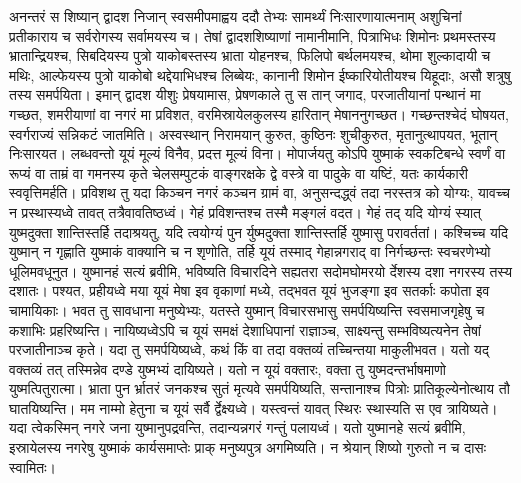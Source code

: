 \adhyAya
{}
\vakya अनन्तरं स शिष्यान् द्वादश निजान् स्वसमीपमाह्वय ददौ तेभ्यः सामर्थ्यं निःसारणायात्मनाम् अशुचिनां प्रतीकाराय च सर्वरोगस्य सर्वामयस्य च।
\vakya तेषां द्वादशशिष्याणां नामानीमानि, पित्राभिधः शिमोनः प्रथमस्तस्य भ्रातान्द्रियश्च, सिबदियस्य पुत्रो याकोबस्तस्य भ्राता योहनश्च,
\vakya फिलिपो बर्थलमयश्च, थोमा शुल्कादायी च मथिः, आल्फेयस्य पुत्रो याकोबो थद्देयाभिधश्च लिब्बेयः,
\vakya कानानी शिमोन ईष्कारियोतीयश्च यिहूदाः, असौ शत्रुषु तस्य समर्पयिता।
\vakya इमान् द्वादश यीशुः प्रेषयामास, प्रेषणकाले तु स तान् जगाद, परजातीयानां पन्थानं मा गच्छत, शमरीयाणां वा नगरं मा प्रविशत, वरमिस्रायेलकुलस्य हारितान् मेषाननुगच्छत।
\vakya गच्छन्तश्चेदं घोषयत, स्वर्गराज्यं सन्निकटं जातमिति।
\vakya अस्वस्थान् निरामयान् कुरुत, कुष्ठिनः शुचीकुरुत, मृतानुत्थापयत, भूतान् निःसारयत।
\vakya लब्धवन्तो यूयं मूल्यं विनैव, प्रदत्त मूल्यं विना।
\vakya मोपार्जयतु कोऽपि युष्माकं स्वकटिबन्धे स्वर्णं वा रूप्यं वा ताम्रं
\vakya वा गमनस्य कृते चेलसम्पुटकं वाङ्गरक्षके द्वे वस्त्रे वा पादुके वा यष्टिं, यतः कार्यकारी स्ववृत्तिमर्हति।
\vakya प्रविशथ तु यदा किञ्चन नगरं कञ्चन ग्रामं वा, अनुसन्दद्ध्वं तदा नरस्तत्र को योग्यः, यावच्च न प्रस्थास्यध्वे तावत् तत्रैवावतिष्ठध्वं।
\vakya गेहं प्रविशन्तश्च तस्मै मङ्गलं वदत।
\vakya गेहं तद् यदि योग्यं स्यात् युष्मदुक्ता शान्तिस्तर्हि तदाश्रयतु, यदि त्वयोग्यं पुन र्युष्मदुक्ता शान्तिस्तर्हि युष्मासु परावर्ततां।
\vakya कश्चिच्च यदि युष्मान् न गृह्णाति युष्माकं वाक्यानि च न शृणोति, तर्हि यूयं तस्माद् गेहान्नगराद् वा निर्गच्छन्तः स्वचरणेभ्यो धूलिमवधूनुत।
\vakya युष्मानहं सत्यं ब्रवीमि, भविष्यति विचारदिने सह्यतरा सदोमघोमरयो र्देशस्य दशा नगरस्य तस्य दशातः।
\vakya पश्यत, प्रहीयध्वे मया यूयं मेषा इव वृकाणां मध्ये, तद्भवत यूयं भुजङ्गा इव सतर्काः कपोता इव चामायिकाः।
\vakya भवत तु सावधाना मनुष्येभ्यः, यतस्ते युष्मान् विचारसभासु समर्पयिष्यन्ति स्वसमाजगृहेषु च कशाभिः प्रहरिष्यन्ति।
\vakya नायिष्यध्वेऽपि च यूयं समक्षं देशाधिपानां राज्ञाञ्च, साक्ष्यन्तु सम्भविष्यत्यनेन तेषां परजातीनाञ्च कृते।
\vakya यदा तु समर्पयिष्यध्वे, कथं किं वा तदा वक्तव्यं तच्चिन्तया माकुलीभवत। यतो यद् वक्तव्यं तत् तस्मिन्नेव दण्डे युष्मभ्यं दायिष्यते।
\vakya यतो न यूयं वक्तारः, वक्ता तु युष्मदन्तर्भाषमाणो युष्मत्पितुरात्मा।
\vakya भ्राता पुन र्भ्रातरं जनकश्च सुतं मृत्यवे समर्पयिष्यति, सन्तानाश्च पित्रोः प्रातिकूल्येनोत्थाय तौ घातयिष्यन्ति।
\vakya मम नाम्मो हेतुना च यूयं सर्वै र्द्वेक्ष्यध्वे। यस्त्वन्तं यावत् स्थिरः स्थास्यति स एव त्रायिष्यते।
\vakya यदा त्वेकस्मिन् नगरे जना युष्मानुपद्रवन्ति, तदान्यन्नगरं गन्तुं पलायध्वं। यतो युष्मानहे सत्यं ब्रवीमि, इस्रायेलस्य नगरेषु युष्माकं कार्यसमाप्तेः प्राक् मनुष्यपुत्र अगमिष्यति।
\vakya न श्रेयान् शिष्यो गुरुतो न च दासः स्वामितः।
